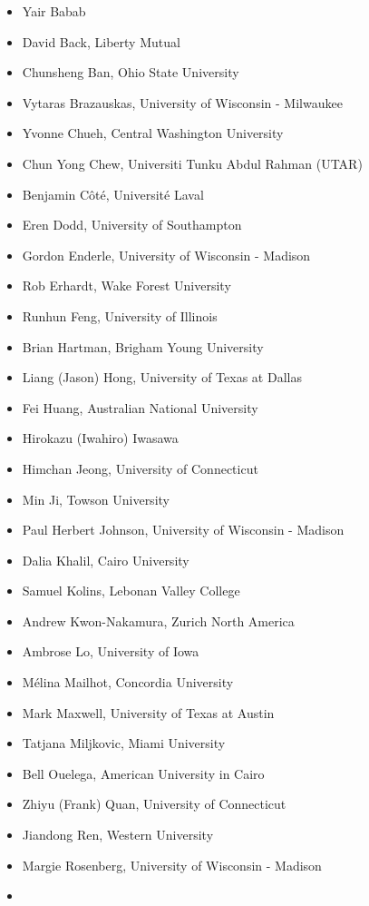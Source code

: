 \documentclass[
  12pt,
  krantz2]{Format/krantzNoCorner}
\providecommand{\tightlist}{%
  \setlength{\itemsep}{0pt}\setlength{\parskip}{0pt}}
\begin{document}
\begin{itemize}
\tightlist
\item
  Yair Babab
\item
  David Back, Liberty Mutual
\item
  Chunsheng Ban, Ohio State University
\item
  Vytaras Brazauskas, University of Wisconsin - Milwaukee
\item
  Yvonne Chueh, Central Washington University
\item
  Chun Yong Chew, Universiti Tunku Abdul Rahman (UTAR)
\item
  Benjamin Côté, Université Laval
\item
  Eren Dodd, University of Southampton
\item
  Gordon Enderle, University of Wisconsin - Madison
\item
  Rob Erhardt, Wake Forest University
\item
  Runhun Feng, University of Illinois
\item
  Brian Hartman, Brigham Young University
\item
  Liang (Jason) Hong, University of Texas at Dallas
\item
  Fei Huang, Australian National University
\item
  Hirokazu (Iwahiro) Iwasawa
\item
  Himchan Jeong, University of Connecticut
\item
  Min Ji, Towson University
\item
  Paul Herbert Johnson, University of Wisconsin - Madison
\item
  Dalia Khalil, Cairo University
\item
  Samuel Kolins, Lebonan Valley College
\item
  Andrew Kwon-Nakamura, Zurich North America
\item
  Ambrose Lo, University of Iowa
\item
  Mélina Mailhot, Concordia University
\item
  Mark Maxwell, University of Texas at Austin
\item
  Tatjana Miljkovic, Miami University
\item
  Bell Ouelega, American University in Cairo
\item
  Zhiyu (Frank) Quan, University of Connecticut
\item
  Jiandong Ren, Western University
\item
  Margie Rosenberg, University of Wisconsin - Madison
\item

\end{itemize}
\end{document}
